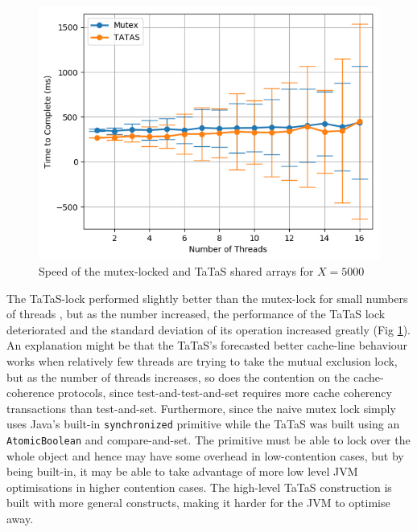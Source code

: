 \documentclass[11pt]{article}
\begin{document}
\begin{figure}
\centering
\includegraphics[scale=0.65]{step4_1.png}
\caption{Speed of the mutex-locked and TaTaS shared arrays for $X=5000$}
\label{fig:step4_1}
\end{figure}


The TaTaS-lock performed slightly better than the mutex-lock for small numbers of threads , but as the number increased, the performance of the TaTaS lock deteriorated and the standard deviation of its operation increased greatly (Fig \ref{fig:step4_1}). An explanation might be that the TaTaS's forecasted better cache-line behaviour works when relatively few threads are trying to take the mutual exclusion lock, but as the number of threads increases, so does the contention on the cache-coherence protocols, since test-and-test-and-set requires more cache coherency transactions than test-and-set. Furthermore, since the naive mutex lock simply uses Java's built-in \texttt{synchronized} primitive while the TaTaS was built using an \texttt{AtomicBoolean} and compare-and-set. The primitive must be able to lock over the whole object and hence may have some overhead in low-contention cases, but by being built-in, it may be able to take advantage of more low level JVM optimisations in higher contention cases. The high-level TaTaS construction is built with more general constructs, making it harder for the JVM to optimise away.
\end{document}
